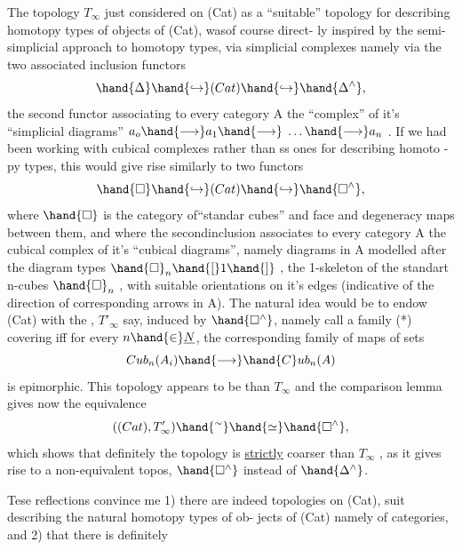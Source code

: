 The topology $T_\infty$  just considered on (Cat) as a ``suitable'' topology
for describing homotopy types of objects of (Cat),  was\hand{|}of course direct-%
ly inspired by the semi-simplicial approach to homotopy types,  via
simplicial complexes  namely via the two associated inclusion functors
\[ \hand{\Delta} \hand{\hookrightarrow} (Cat)\hand{\hookrightarrow} \hand{\Delta^{\wedge}} , \]
the second functor associating to every category A the ``complex'' of it's
``simplicial diagrams''  $a_o\hand{\longrightarrow} a_1\hand{\longrightarrow} \;\ldots\hand{\longrightarrow} a_n$ .  If we had been working
 with  cubical complexes rather than ss ones for describing homoto
-py types,  this would give rise similarly to two functors
\[ \hand{\square} \hand{\hookrightarrow} (Cat)\hand{\hookrightarrow} \hand{\square^{\wedge}} , \]
where $\hand{\square}$ is the category of``standar cubes'' and face and degeneracy
maps between them,  and where the second\hand{|}inclusion associates to every
category A the cubical complex of it's  ``cubical diagrams'',  namely 
diagrams in A modelled after the diagram types $\hand{\square}_n\hand{[}1\hand{]}$ ,  the 1-skeleton
of the standart n-cubes $\hand{\square}_n$ , with suitable orientations on it's edges
(indicative of the direction of corresponding arrows in A).  The natural
idea  would be to endow (Cat) with the , $T'_\infty$ say,  induced
by $\hand{\square^{\wedge}}$,  namely call a family (*)  covering iff for every $n\hand{\in} \underline{N}$,  the
corresponding family  of  maps of sets
\[ Cub_n(A_i)\hand{\longrightarrow} \hand{C}ub_n(A) \]
is epimorphic.   This  topology appears to be  than $T_\infty$ \xout{,}
and the comparison lemma gives now the equivalence
\[ ((Cat),T'_\infty)\hand{^{\sim}} \hand{\simeq} \hand{\square^{\wedge}} , \]
which shows that definitely the topology is \uline{strictly} coarser than $T_\infty$ ,
as it gives rise to a non-equivalent topos,  $\hand{\square^{\wedge}}$ instead of $\hand{\Delta^{\wedge}}$.

Tese reflections convince me  1)  there are indeed topologies
on (Cat),  suit describing the natural homotopy types of ob-%
jects of (Cat) namely of categories,  and  2)  that there is definitely
